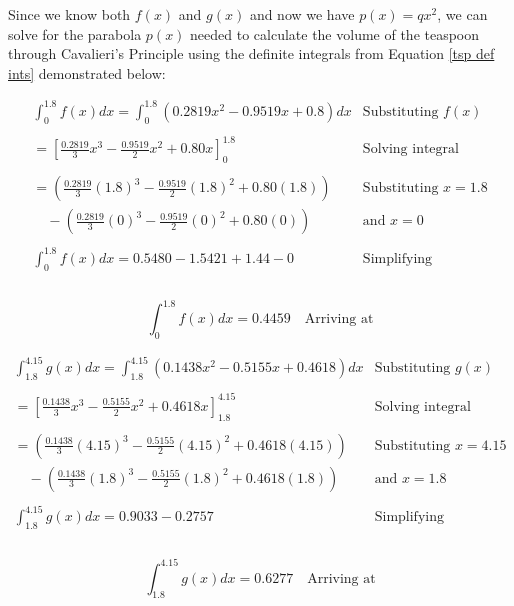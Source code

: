 \documentclass[12pt]{article}
\begin{document}
Since we know both $f(x)$ and $g(x)$ and now we have $p(x)=qx^2$, we can solve for the parabola $p(x)$ needed to calculate the volume of the teaspoon through Cavalieri's Principle using the definite integrals from Equation \ref{tsp def ints} demonstrated below:

$$
\begin{array}{l|c}
    \int_0^{1.8}{f(x)}dx = \int_0^{1.8}{(0.2819x^2 -0.9519x +0.8)}dx & \text{Substituting } f(x) \\ \\
    = \left[   \frac{0.2819}{3}x^3 -  \frac{0.9519}{2}x^2 + 0.80x \right]_0^{1.8} & \text{Solving integral} \\ \\
    = (\frac{0.2819}{3}(1.8)^3 - \frac{0.9519}{2}(1.8)^2 + 0.80(1.8)) & \text{Substituting } x=1.8 \\
    \quad -(\frac{0.2819}{3}(0)^3 - \frac{0.9519}{2}(0)^2 + 0.80(0))  & \text{and } x=0 \\ \\
    \int_0^{1.8}{f(x)}dx = 0.5480 - 1.5421 + 1.44 -0 & \text{Simplifying} \\ \\
 \end{array}
$$

\begin{equation}\label{tsp.int.fx}
    \boxed{\int_0^{1.8}{f(x)}dx = 0.4459}  \quad \text{Arriving at}
\end{equation}

$$
\begin{array}{l|c}
   \int_{1.8}^{4.15}{g(x)}dx = \int_{1.8}^{4.15}{(0.1438x^2 -0.5155x + 0.4618)}dx & \text{Substituting } g(x) \\ \\
    = \left[   \frac{0.1438}{3}x^3 -  \frac{0.5155}{2}x^2 + 0.4618x \right]_{1.8}^{4.15} & \text{Solving integral} \\ \\
    = (\frac{0.1438}{3}(4.15)^3 - \frac{0.5155}{2}(4.15)^2 + 0.4618(4.15)) & \text{Substituting } x=4.15 \\ \quad -(\frac{0.1438}{3}(1.8)^3 - \frac{0.5155}{2}(1.8)^2 + 0.4618(1.8)) & \text{and } x=1.8 \\ \\
    \int_{1.8}^{4.15}{g(x)}dx = 0.9033 -0.2757 & \text{Simplifying} \\ \\
 \end{array}
$$

\begin{equation}\label{tsp.int.gx}
    \boxed{\int_{1.8}^{4.15}{g(x)}dx = 0.6277}  \quad \text{Arriving at}
\end{equation}
\end{document}
